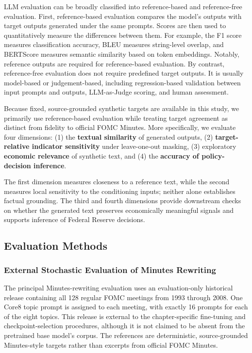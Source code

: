 LLM evaluation can be broadly classified into reference-based and reference-free evaluation. First, reference-based evaluation compares the model’s outputs with target outputs generated under the same prompts. Scores are then used to quantitatively measure the differences between them. For example, the F1 score measures classification accuracy, BLEU \cite{papineni2002bleu} measures string-level overlap, and BERTScore \cite{zhang2019bertscore} measures semantic similarity based on token embeddings. Notably, reference outputs are required for reference-based evaluation. By contrast, reference-free evaluation does not require predefined target outputs. It is usually model-based or judgement-based, including regression-based validation between input prompts and outputs, LLM-as-Judge scoring, and human assessment.


Because fixed, source-grounded synthetic targets are available in this study,
we primarily use reference-based evaluation while treating target agreement as
distinct from fidelity to official FOMC Minutes. More specifically, we evaluate four
dimensions: (1) the \textbf{textual similarity} of generated outputs, (2)
\textbf{target-relative indicator sensitivity} under leave-one-out masking,
(3) exploratory \textbf{economic relevance} of synthetic text, and (4) the
\textbf{accuracy of policy-decision inference}.


The first dimension measures closeness to a reference text, while the second
measures local sensitivity to the conditioning inputs; neither alone
establishes factual grounding. The third and fourth dimensions provide
downstream checks on whether the generated text preserves economically
meaningful signals and supports inference of Federal Reserve decisions.



\subsection*{Evaluation Methods}

\subsubsection*{External Stochastic Evaluation of Minutes Rewriting}

The principal Minutes-rewriting evaluation uses an evaluation-only historical
release containing all 128 regular FOMC meetings from 1993 through 2008. One
Core8 topic prompt is assigned to each meeting, with exactly 16 prompts for
each of the eight topics. This release is external to the chapter-specific
fine-tuning and checkpoint-selection procedures, although it is not claimed to
be absent from the pretrained base model's corpus. The references are
deterministic, source-grounded Minutes-style targets rather than excerpts from
official FOMC Minutes.

